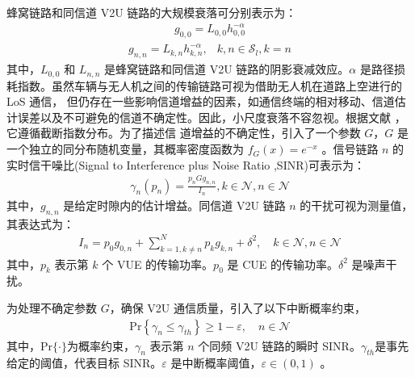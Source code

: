 蜂窝链路和同信道 V2U 链路的大规模衰落可分别表示为：
\begin{eqnarray}\label{E2-3}
g_{0,0}=L_{0,0}h_{0,0}^{-\alpha}
\end{eqnarray}
\begin{eqnarray}\label{E2-4}
g_{n,n}=L_{k,n}h_{k,n}^{-\alpha},          &k, n\in \mathcal{S}_l, k=n
\end{eqnarray}
其中，$L_{0,0}$ 和 $L_{n,n}$ 是蜂窝链路和同信道 V2U 链路的阴影衰减效应。$\alpha$ 是路径损耗指数。虽然车辆与无人机之间的传输链路可视为借助无人机在道路上空进行的 LoS 通信，
但仍存在一些影响信道增益的因素，如通信终端的相对移动、信道估计误差以及不可避免的信道不确定性。因此，小尺度衰落不容忽视。根据文献 \cite{CCO}，它遵循截断指数分布。为了描述信
道增益的不确定性，引入了一个参数 $G$，$G$ 是一个独立的同分布随机变量，其概率密度函数为 $f_G (x)=e^{-x}$ 。信号链路 $n$ 的实时信干噪比(Signal to Interference plus Noise Ratio ,SINR)可表示为：
\begin{eqnarray}\label{E2-5}
\gamma_{n}(p_n)=\frac{p_{n}G g_{n,n}}{I_n}, k\in\mathcal{N},n\in\mathcal{N}
\end{eqnarray}
其中，$g_{n,n}$ 是给定时隙内的估计增益。同信道 V2U 链路 $n$ 的干扰可视为测量值，其表达式为：
\begin{eqnarray}\label{E2-6}
I_n=p_0 g_{0,n}+\!\!\!\sum\limits_{k=1,k\neq n}^N\!\!\!\! p_k g_{k,n}+\delta^2, \quad k\in\mathcal{N},n\in\mathcal{N}
\end{eqnarray}
其中，$p_k$ 表示第 $k$ 个 VUE 的传输功率。$p_0$ 是 CUE 的传输功率。$\delta^2$ 是噪声干扰。

为处理不确定参数 $G$，确保 V2U 通信质量，引入了以下中断概率约束，
\begin{eqnarray}\label{E2-7}
\textrm{Pr}\left\{\gamma_{n} \leq \gamma_{th}\right\}\geq1-\varepsilon,\quad  n\in\mathcal{N}
\end{eqnarray}
其中，$\textrm{Pr}\{\cdot\}$为概率约束，$\gamma_{n}$ 表示第 $n$ 个同频 V2U 链路的瞬时 SINR。$\gamma_{th}$是事先给定的阈值，代表目标 SINR。$\varepsilon$ 是中断概率阈值，$\varepsilon \in (0,1)$ 。

